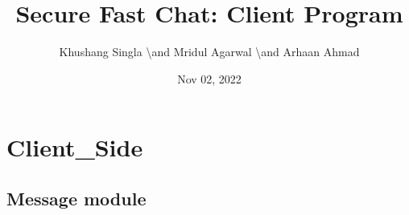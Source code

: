 \documentclass[letterpaper,10pt,english]{sphinxmanual}
\title{Secure Fast Chat: Client Program}
\date{Nov 02, 2022}
\author{Khushang Singla \textbackslash{}and Mridul Agarwal \textbackslash{}and Arhaan Ahmad}
\begin{document}
\pagestyle{empty}
\sphinxmaketitle
\pagestyle{plain}
\sphinxtableofcontents
\pagestyle{normal}
\label{\detokenize{index::doc}}



\chapter{Client\_Side}
\label{\detokenize{modules:client-side}}\label{\detokenize{modules::doc}}

\section{Message module}
\label{\detokenize{Message:module-Message}}\label{\detokenize{Message:message-module}}\label{\detokenize{Message::doc}}
\end{document}
